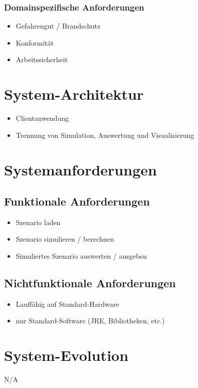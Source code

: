 \documentclass[11pt,a4paper]{article}
\begin{document}
%
\subsubsection{Domainspezifische Anforderungen}
\begin{itemize}
  \item Gefahrengut / Brandschutz
  \item Konformität
  \item Arbeitssicherheit
\end{itemize}
%
\section{System-Architektur}
\begin{itemize}
  \item Clientanwendung
  \item Trennung von Simulation, Auswertung und Visualisierung
\end{itemize}
%
\section{Systemanforderungen}
%
\subsection{Funktionale Anforderungen}
\begin{itemize}
  \item Szenario laden
  \item Szenario simulieren / berechnen
  \item Simuliertes Szenario auswerten / ausgeben
\end{itemize}
%
\subsection{Nichtfunktionale Anforderungen}
\begin{itemize}
  \item Lauffähig auf Standard-Hardware
  \item nur Standard-Software (JRE, Bibliotheken, etc.)
\end{itemize}
%
\section{System-Evolution}
N/A
%
\end{document}
